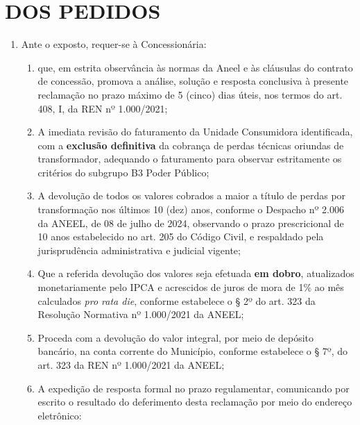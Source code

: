 \section{DOS PEDIDOS}

\begin{enumerate}[resume]
\item Ante o exposto, requer-se à Concessionária:
    \begin{enumerate}
    \item que, em estrita observância às normas da Aneel e às cláusulas do contrato de concessão, promova a análise, solução e resposta conclusiva à presente reclamação no prazo máximo de 5 (cinco) dias úteis, nos termos do art. 408, I, da REN nº 1.000/2021;
    \item A imediata revisão do faturamento da Unidade Consumidora identificada, com a \textbf{exclusão definitiva} da cobrança de perdas técnicas oriundas de transformador, adequando o faturamento para observar estritamente os critérios do subgrupo B3 Poder Público;
    \item A devolução de todos os valores cobrados a maior a título de perdas por transformação nos últimos 10 (dez) anos, conforme o Despacho nº 2.006 da ANEEL, de 08 de julho de 2024, observando o prazo prescricional de 10 anos estabelecido no art. 205 do Código Civil, e respaldado pela jurisprudência administrativa e judicial vigente;
    \item Que a referida devolução dos valores seja efetuada \textbf{em dobro}, atualizados monetariamente pelo IPCA e acrescidos de juros de mora de 1\% ao mês calculados \textit{pro rata die}, conforme estabelece o § 2º do art. 323 da Resolução Normativa nº 1.000/2021 da ANEEL;
    \item Proceda com a devolução do valor integral, por meio de depósito bancário, na conta corrente do Município, conforme estabelece o § 7º, do art. 323 da REN nº 1.000/2021 da ANEEL;
    \item A expedição de resposta formal no prazo regulamentar, comunicando por escrito o resultado do deferimento desta reclamação por meio do endereço eletrônico: \emailEmpresa{}
    \end{enumerate}
\end{enumerate}